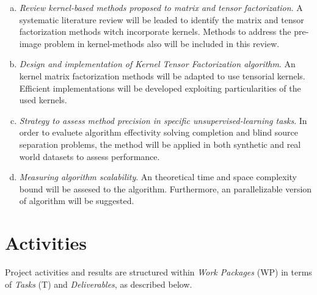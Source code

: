 \documentclass[letterpaper,12pt]{article}
\begin{document}
\begin{enumerate}[(a)]
 \item \textit{Review kernel-based methods proposed to matrix and tensor factorization}. A systematic literature review will be leaded to identify the matrix and tensor factorization methods witch incorporate kernels. Methods to address the pre-image problem in kernel-methods also will be included in this review.

\item \textit{Design and implementation of Kernel Tensor Factorization algorithm}. An kernel matrix factorization methods will be adapted to use tensorial kernels. Efficient implementations will be developed exploiting particularities of the used kernels. 
\item \textit{Strategy to assess method precision in specific unsupervised-learning tasks}. In order to evaluete algorithm effectivity solving completion and blind source separation problems, the method will be applied in both synthetic and real world datasets to assess performance.


\item \textit{Measuring algorithm scalability}. An theoretical time and space complexity bound will be assesed to the algorithm. Furthermore, an parallelizable version of algorithm will be suggested.
\end{enumerate}



 
\section{Activities}

Project activities and results are structured within \textit{Work Packages} (WP) in terms of \textit{Tasks} (T) and \textit{Deliverables}, as described below.
\end{document}
